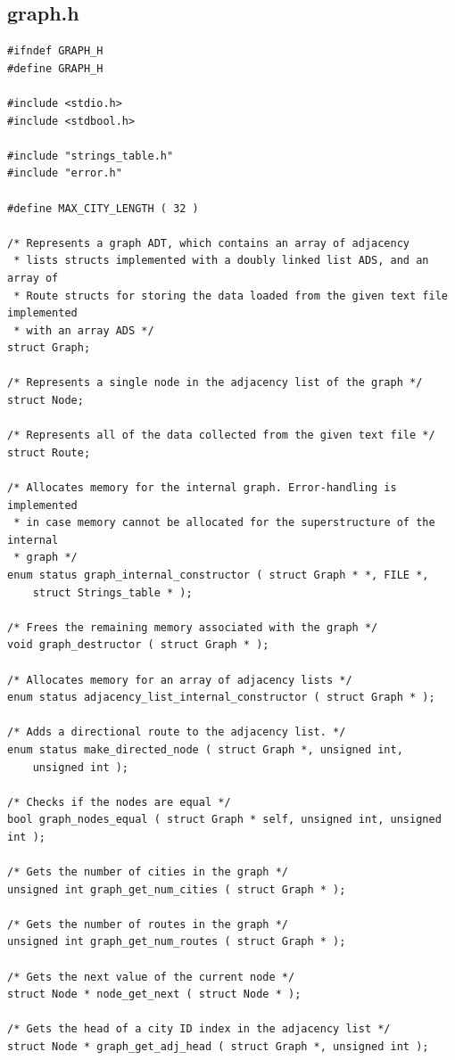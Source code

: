 \documentclass[11pt]{article}
\begin{document}
\subsection{graph.h}
\begin{verbatim}
#ifndef GRAPH_H
#define GRAPH_H

#include <stdio.h>
#include <stdbool.h>

#include "strings_table.h"
#include "error.h"

#define MAX_CITY_LENGTH ( 32 )

/* Represents a graph ADT, which contains an array of adjacency
 * lists structs implemented with a doubly linked list ADS, and an array of
 * Route structs for storing the data loaded from the given text file implemented
 * with an array ADS */
struct Graph;

/* Represents a single node in the adjacency list of the graph */
struct Node;

/* Represents all of the data collected from the given text file */
struct Route;

/* Allocates memory for the internal graph. Error-handling is implemented
 * in case memory cannot be allocated for the superstructure of the internal
 * graph */
enum status graph_internal_constructor ( struct Graph * *, FILE *,
    struct Strings_table * );

/* Frees the remaining memory associated with the graph */
void graph_destructor ( struct Graph * );

/* Allocates memory for an array of adjacency lists */
enum status adjacency_list_internal_constructor ( struct Graph * );

/* Adds a directional route to the adjacency list. */
enum status make_directed_node ( struct Graph *, unsigned int,
    unsigned int );

/* Checks if the nodes are equal */
bool graph_nodes_equal ( struct Graph * self, unsigned int, unsigned int );

/* Gets the number of cities in the graph */
unsigned int graph_get_num_cities ( struct Graph * );

/* Gets the number of routes in the graph */
unsigned int graph_get_num_routes ( struct Graph * );

/* Gets the next value of the current node */
struct Node * node_get_next ( struct Node * );

/* Gets the head of a city ID index in the adjacency list */
struct Node * graph_get_adj_head ( struct Graph *, unsigned int );


\end{verbatim}
\end{document}
